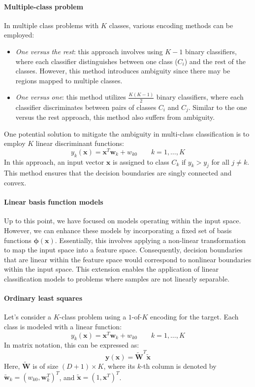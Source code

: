 \paragraph*{Multiple-class problem}
In multiple class problems with $K$ classes, various encoding methods can be employed:
\begin{itemize}
    \item \textit{One versus the rest}: this approach involves using $K-1$ binary classifiers, where each classifier distinguishes between one class ($C_i$) and the rest of the classes.
        However, this method introduces ambiguity since there may be regions mapped to multiple classes.
    \item \textit{One versus one}: this method utilizes $\frac{K(K-1)}{2}$ binary classifiers, where each classifier discriminates between pairs of classes $C_i$ and $C_j$. 
        Similar to the one versus the rest approach, this method also suffers from ambiguity.
\end{itemize}
One potential solution to mitigate the ambiguity in multi-class classification is to employ $K$ linear discriminant functions:
\[y_k(\textbf{x})=\textbf{x}^T\textbf{w}_k+w_{k0} \qquad k=1,\dots,K\]
In this approach, an input vector $\textbf{x}$ is assigned to class $C_k$ if $y_k>y_j$ for all $j \neq k$. 
This method ensures that the decision boundaries are singly connected and convex.

\paragraph*{Linear basis function models}
Up to this point, we have focused on models operating within the input space.
However, we can enhance these models by incorporating a fixed set of basis functions $\boldsymbol{\phi}(\textbf{x})$. 
Essentially, this involves applying a non-linear transformation to map the input space into a feature space. 
Consequently, decision boundaries that are linear within the feature space would correspond to nonlinear boundaries within the input space.
This extension enables the application of linear classification models to problems where samples are not linearly separable.

\paragraph*{Ordinary least squares}
Let's consider a $K$-class problem using a $1$-of-$K$ encoding for the target. 
Each class is modeled with a linear function:
\[y_k(\textbf{x})=\textbf{x}^T\textbf{w}_k+w_{k0} \qquad k=1,\dots,K\]
In matrix notation, this can be expressed as:
\[\textbf{y}(\textbf{x})=\tilde{\textbf{W}}^T\tilde{\textbf{x}}\]
Here, $\tilde{\textbf{W}}$ is of size $(D+1)\times K $, where its $k$-th column is denoted by $\tilde{\textbf{w}}_{k}=\left(w_{k0},\textbf{w}_k^T\right)^T$, and $\tilde{\textbf{x}}=\left(1,\textbf{x}^T\right)^T$. 


